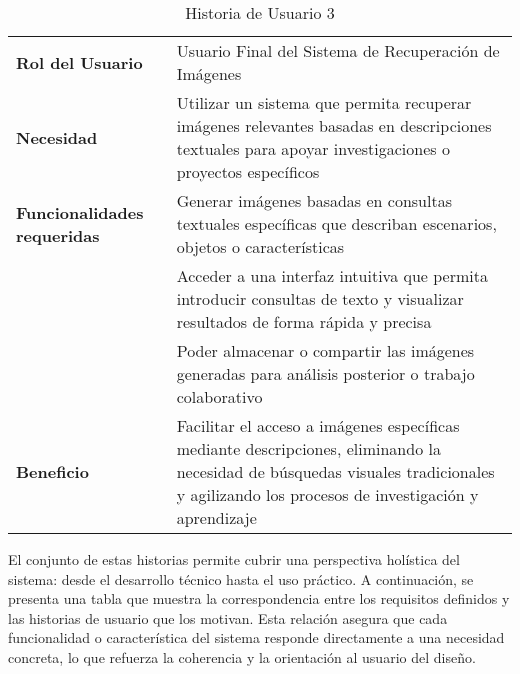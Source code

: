 \begin{table}[ht]
    \centering
    \renewcommand{\arraystretch}{1.5}
    \begin{tabular}{|>{\columncolor{gray!10}}p{4cm}|p{10cm}|}
        \hline
        \rowcolor{gray!30}
        \multicolumn{2}{|c|}{\textbf{Historia de Usuario 3}} \\
        \hline
        \textbf{Rol del Usuario} & Usuario Final del Sistema de Recuperación de Imágenes \\
        \hline
        \textbf{Necesidad} & Utilizar un sistema que permita recuperar imágenes relevantes basadas en descripciones textuales para apoyar investigaciones o proyectos específicos \\
        \hline
        \textbf{Funcionalidades requeridas} & Generar imágenes basadas en consultas textuales específicas que describan escenarios, objetos o características
        \\ & Acceder a una interfaz intuitiva que permita introducir consultas de texto y visualizar resultados de forma rápida y precisa
        \\ & Poder almacenar o compartir las imágenes generadas para análisis posterior o trabajo colaborativo \\
        \hline
        \textbf{Beneficio} & Facilitar el acceso a imágenes específicas mediante descripciones, eliminando la necesidad de búsquedas visuales tradicionales y agilizando los procesos de investigación y aprendizaje \\
        \hline
    \end{tabular}
    \caption{Historia de Usuario 3}
    \label{tab:hu03}
\end{table}

El conjunto de estas historias permite cubrir una perspectiva holística del sistema: desde el desarrollo técnico hasta el uso práctico. A continuación, se presenta una tabla que muestra la correspondencia entre los requisitos definidos y las historias de usuario que los motivan. Esta relación asegura que cada funcionalidad o característica del sistema responde directamente a una necesidad concreta, lo que refuerza la coherencia y la orientación al usuario del diseño.


